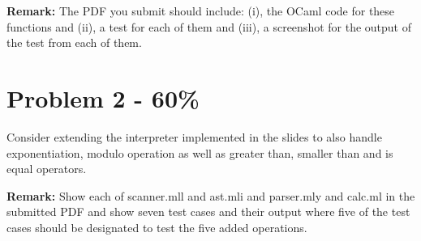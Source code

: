 \documentclass{article}
\newcommand{\answerboxbig}{
    \vspace{20cm} %
}
\begin{document}
	\textbf{Remark:} The PDF you submit should include: (i), the OCaml code for these functions and (ii), a test for each of them and (iii), a screenshot for the output of the test from each of them.
	

\answerboxbig


\section*{Problem 2 - 60\%}

Consider extending the interpreter implemented in the slides to also handle exponentiation,  modulo operation as well as greater than, smaller than and is equal operators.

\textbf{Remark:} 
    Show each of scanner.mll and ast.mli and parser.mly and calc.ml in the submitted PDF and show seven test cases and their output where five of the test cases should be designated to test the five added operations.

\answerboxbig



\end{document}
